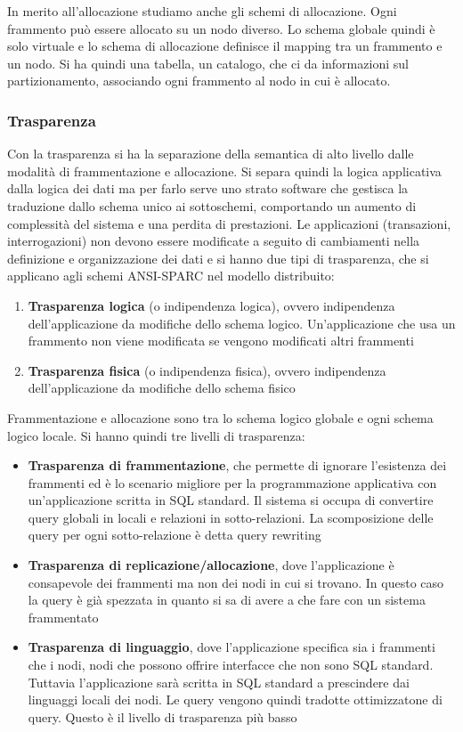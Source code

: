 In merito all'allocazione studiamo anche gli schemi di allocazione. Ogni
frammento può essere allocato su un nodo diverso. Lo schema globale quindi
è solo virtuale e lo schema di allocazione definisce il mapping tra un frammento
e un nodo. Si ha quindi una tabella, un catalogo, che ci da informazioni sul
partizionamento, associando ogni frammento al nodo in cui è allocato.
\subsubsection{Trasparenza}
Con la trasparenza si ha la separazione della semantica di alto livello dalle
modalità di frammentazione e allocazione. Si separa quindi la logica applicativa
dalla logica dei dati ma per farlo serve uno strato software che gestisca la
traduzione dallo schema unico ai sottoschemi, comportando un aumento di
complessità del sistema e una perdita di prestazioni.
Le applicazioni (transazioni, interrogazioni) non devono essere modificate a
seguito di cambiamenti nella definizione e organizzazione dei dati e si hanno
due tipi di trasparenza, che si applicano agli schemi ANSI-SPARC nel
modello distribuito:
\begin{enumerate}
    \item \textbf{Trasparenza logica} (o indipendenza logica), ovvero indipendenza
          dell'applicazione da modifiche dello schema logico. Un'applicazione
          che usa un frammento non viene modificata se vengono modificati altri
          frammenti
    \item \textbf{Trasparenza fisica} (o indipendenza fisica), ovvero indipendenza
          dell'applicazione da modifiche dello schema fisico
\end{enumerate}

Frammentazione e allocazione sono tra lo schema logico globale e ogni schema
logico locale. Si hanno quindi tre livelli di trasparenza:
\begin{itemize}
    \item \textbf{Trasparenza di frammentazione}, che permette di ignorare
          l'esistenza dei frammenti ed è lo scenario migliore per la programmazione
          applicativa con un'applicazione scritta in SQL standard. Il sistema si
          occupa di convertire query globali in locali e relazioni in sotto-relazioni.
          La scomposizione delle query per ogni sotto-relazione è detta query rewriting
    \item \textbf{Trasparenza di replicazione/allocazione}, dove l'applicazione
          è consapevole dei frammenti ma non dei nodi in cui si trovano. In questo
          caso la query è già spezzata in quanto si sa di avere a che fare con un
          sistema frammentato
    \item \textbf{Trasparenza di linguaggio}, dove l'applicazione specifica sia i
          frammenti che i nodi, nodi che possono offrire interfacce che non sono
          SQL standard. Tuttavia l'applicazione sarà scritta in SQL standard a
          prescindere dai linguaggi locali dei nodi. Le query vengono quindi tradotte
          ottimizzatone di query. Questo è il livello di trasparenza più basso
\end{itemize}
